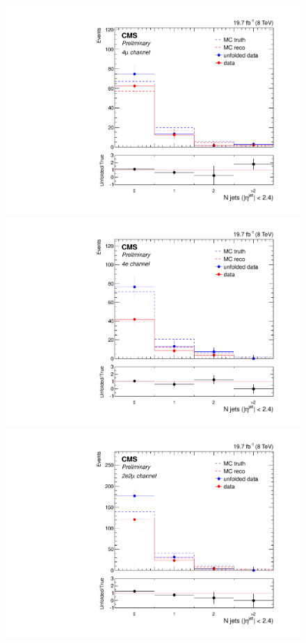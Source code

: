 \begin{figure}[hbtp]
  \begin{center}
    \includegraphics[width=\cmsFigWidth]{Figures/CentralJets_ZZTo4m_Mad_fr_binwidth}
    \includegraphics[width=\cmsFigWidth]{Figures/CentralJets_ZZTo4e_Mad_fr_binwidth}
    \includegraphics[width=\cmsFigWidth]{Figures/CentralJets_ZZTo2e2m_Mad_fr_binwidth}     

\end{center}
\end{figure}
